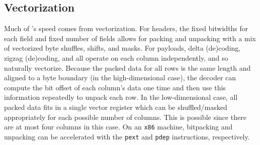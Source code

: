 \subsection{Vectorization}

Much of \mine's speed comes from vectorization. For headers, the fixed bitwidths for each field and fixed number of fields allows for packing and unpacking with a mix of vectorized byte shuffles, shifts, and masks. For payloads, delta (de)coding, zigzag (de)coding, and \fire all operate on each column independently, and so naturally vectorize. Because the packed data for all rows is the same length and aligned to a byte boundary (in the high-dimensional case), the decoder can compute the bit offset of each column's data one time and then use this information repeatedly to unpack each row. In the low-dimensional case, all packed data fits in a single vector register which can be shuffled/masked appropriately for each possible number of columns. This is possible since there are at most four columns in this case. On an \texttt{x86} machine, bitpacking and unpacking can be accelerated with the \texttt{pext} and \texttt{pdep} instructions, respectively.
